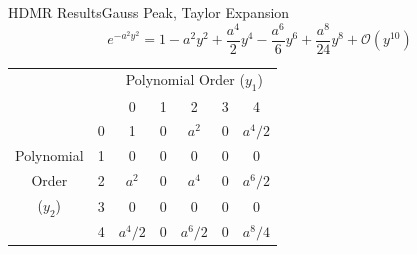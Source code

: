 \documentclass{beamer}
\begin{document}
\begin{frame}{HDMR Results}{Gauss Peak, Taylor Expansion}\vspace{-20pt}
\begin{equation*}
  e^{-a^2y^2} = 1 - a^2y^2 + \frac{a^4}{2}y^4 - \frac{a^6}{6}y^6 + \frac{a^8}{24}y^8 + \mathcal{O}(y^{10})
\end{equation*}
\begin{table}
  \centering
  \begin{tabular}{|c c|c c c c c|}
    \cline{3-7}\multicolumn{2}{c|}{ } & \multicolumn{5}{c|}{Polynomial Order ($y_1$)} \\
\multicolumn{2}{c|}{ } & 0       & 1 & 2       & 3 & 4       \\
    \hline         & 0 & 1       & 0 & $a^2$   & 0 & $a^4/2$ \\
Polynomial         & 1 & 0       & 0 & 0       & 0 & 0       \\
Order              & 2 & $a^2$   & 0 & $a^4$   & 0 & $a^6/2$ \\
($y_2$)            & 3 & 0       & 0 & 0       & 0 & 0       \\
                   & 4 & $a^4/2$ & 0 & $a^6/2$ & 0 & $a^8/4$ \\
    \hline
  \end{tabular}
\end{table}
\end{frame}
\end{document}
